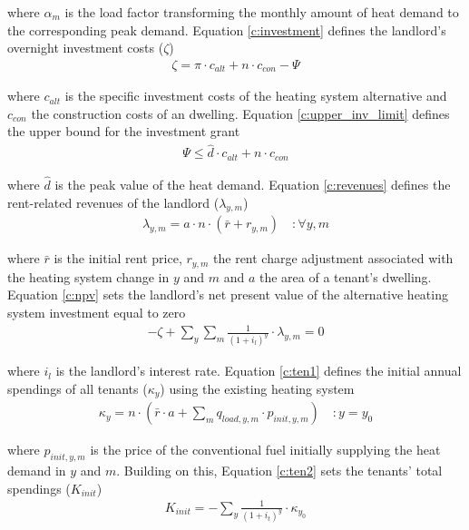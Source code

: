 where $\alpha_{m}$ is the load factor transforming the monthly amount of heat demand to the corresponding peak demand. Equation \ref{c:investment} defines the landlord's overnight investment costs ($\zeta$)
\begin{align}\label{c:investment}
\zeta = \pi \cdot c_{alt} + n \cdot c_{con} - \Psi
\end{align}

where $c_{alt}$ is the specific investment costs of the heating system alternative and $c_{con}$ the construction costs of an dwelling. Equation \ref{c:upper_inv_limit} defines the upper bound for the investment grant 
\begin{align}\label{c:upper_inv_limit}
\Psi \leq \hat{d} \cdot c_{alt} + n \cdot c_{con}
\end{align}

where $\hat{d}$ is the peak value of the heat demand. Equation \ref{c:revenues} defines the rent-related revenues of the landlord ($\lambda_{y,m}$)
\begin{align}\label{c:revenues}
\lambda_{y,m} = a \cdot n \cdot (\bar{r} + r_{y,m}) \quad :\forall y,m
\end{align}

where $\bar{r}$ is the initial rent price, $r_{y,m}$ the rent charge adjustment associated with the heating system change in $y$ and $m$ and $a$ the area of a tenant's dwelling. Equation \ref{c:npv} sets the landlord's net present value of the alternative heating system investment equal to zero
\begin{align}\label{c:npv}
-\zeta + \sum_{y} \sum_{m} \frac{1}{(1+i_l)^y} \cdot \lambda_{y,m} = 0
\end{align}

where $i_l$ is the landlord's interest rate. Equation \ref{c:ten1} defines the initial annual spendings of all tenants ($\kappa_{y}$) using the existing heating system 
\begin{align}\label{c:ten1}
\kappa_{y} = n \cdot (\bar{r} \cdot a + \sum_{m} q_{load,y,m} \cdot p_{init,y,m}) \quad :y=y_0
\end{align}

where $p_{init,y,m}$ is the price of the conventional fuel initially supplying the heat demand in $y$ and $m$. Building on this, Equation \ref{c:ten2} sets the tenants' total spendings ($K_{init}$)
\begin{align}\label{c:ten2}
K_{init} = -\sum_{y} \frac{1}{(1+i_{t})^y} \cdot \kappa_{y_0}
\end{align}

